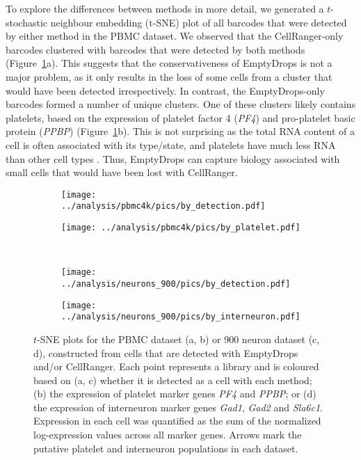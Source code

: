 \documentclass[10pt,letterpaper]{article}
\begin{document}
To explore the differences between methods in more detail, we generated a $t$-stochastic neighbour embedding (t-SNE) plot \cite{van2008visualizing} of all barcodes that were detected by either method in the PBMC dataset.
We observed that the CellRanger-only barcodes clustered with barcodes that were detected by both methods (Figure~\ref{fig:realtsne}a).
This suggests that the conservativeness of EmptyDrops is not a major problem, as it only results in the loss of some cells from a cluster that would have been detected irrespectively.
In contrast, the EmptyDrops-only barcodes formed a number of unique clusters.
One of these clusters likely contains platelets, based on the expression of platelet factor 4 (\textit{PF4}) and pro-platelet basic protein (\textit{PPBP}) (Figure~\ref{fig:realtsne}b). 
This is not surprising as the total RNA content of a cell is often associated with its type/state, and platelets have much less RNA than other cell types \cite{rowley2012platelet}.
Thus, EmptyDrops can capture biology associated with small cells that would have been lost with CellRanger.

\begin{figure}[btp]
    \begin{subfigure}{0.49\textwidth}
        \texttt{[image: ../analysis/pbmc4k/pics/by\_detection.pdf]}
        \caption{}
    \end{subfigure}
    \begin{subfigure}{0.49\textwidth}
        \texttt{[image: ../analysis/pbmc4k/pics/by\_platelet.pdf]}
        \caption{}
    \end{subfigure} \\[0.05in]
    \begin{subfigure}{0.49\textwidth}
        \texttt{[image: ../analysis/neurons\_900/pics/by\_detection.pdf]}
        \caption{}
    \end{subfigure}
    \begin{subfigure}{0.49\textwidth}
        \texttt{[image: ../analysis/neurons\_900/pics/by\_interneuron.pdf]}
        \caption{}
    \end{subfigure} 
    \caption{$t$-SNE plots for the PBMC dataset (a, b) or 900 neuron dataset (c, d), constructed from cells that are detected with EmptyDrops and/or CellRanger.
        Each point represents a library and is coloured based on (a, c) whether it is detected as a cell with each method;
        (b) the expression of platelet marker genes \textit{PF4} and \textit{PPBP};
        or (d) the expression of interneuron marker genes \textit{Gad1}, \textit{Gad2} and \textit{Sla6c1}.
        Expression in each cell was quantified as the sum of the normalized log-expression values across all marker genes.
        Arrows mark the putative platelet and interneuron populations in each dataset.
    }
    \label{fig:realtsne}
\end{figure}
\end{document}

